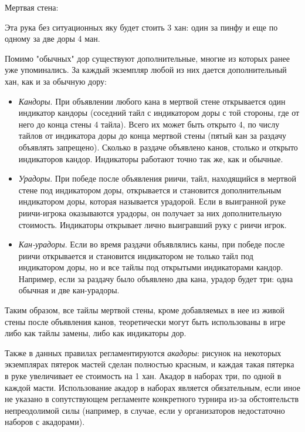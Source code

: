 
Мертвая стена:

Эта рука без ситуационных яку будет стоить 3 хан: один за пинфу и еще по одному за две доры 4 ман.

Помимо "обычных" дор существуют дополнительные, многие из которых ранее уже упоминались. За каждый экземпляр любой из них дается дополнительный хан, как и за обычную дору:
\begin{itemize}
	\item \textit{Кандоры}. При объявлении любого кана в мертвой стене открывается один индикатор кандоры (соседний тайл с индикатором доры с той стороны, где от него до конца стены 4 тайла). Всего их может быть открыто 4, по числу тайлов от индикатора доры до конца мертвой стены (пятый кан за раздачу объявлять запрещено). Сколько в раздаче объявлено канов, столько и открыто индикаторов кандор. Индикаторы работают точно так же, как и обычные.
	\item \textit{Урадоры}. При победе после объявления риичи, тайл, находящийся в мертвой стене под индикатором доры, открывается и становится дополнительным индикатором доры, которая называется урадорой. Если в выигранной руке риичи-игрока оказываются урадоры, он получает за них дополнительную стоимость. Индикаторы открывает лично выигравший руку с риичи игрок.
	\item \textit{Кан-урадоры}. Если во время раздачи объявлялись каны, при победе после риичи открывается и становится индикатором не только тайл под индикатором доры, но и все тайлы под открытыми индикаторами кандор. Например, если за раздачу было объявлено два кана, урадор будет три: одна обычная и две кан-урадоры.
\end{itemize}

Таким образом, все тайлы мертвой стены, кроме добавляемых в нее из живой стены после объявления канов, теоретически могут быть использованы в игре либо как тайлы замены, либо как индикаторы дор.

Также в данных правилах регламентируются \textit{акадоры}: рисунок на некоторых экземплярах пятерок мастей сделан полностью красным, и каждая такая пятерка в руке увеличивает ее стоимость на 1 хан. Акадор в наборах три, по одной в каждой масти. Использование акадор в наборах является обязательным, если иное не указано в сопутствующем регламенте конкретного турнира из-за обстоятельств непреодолимой силы (например, в случае, если у организаторов недостаточно наборов с акадорами).

